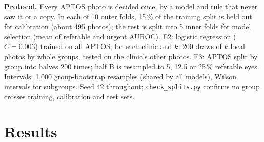 \documentclass[10pt,twocolumn,letterpaper]{article}
\newcommand{\pct}{\,\%}
\begin{document}
\textbf{Protocol.} Every APTOS photo is decided once, by a model and rule that never saw it or a copy. In each of 10 outer folds, 15\pct{} of the training split is held out for calibration (about 495 photos); the rest is split into 5 inner folds for model selection (mean of referable and urgent AUROC). E2: logistic regression ($C{=}0.003$) trained on all APTOS; for each clinic and $k$, 200 draws of $k$ local photos by whole groups, tested on the clinic's other photos. E3: APTOS split by group into halves 200 times; half B is resampled to 5, 12.5 or 25\pct{} referable eyes. Intervals: 1,000 group-bootstrap resamples (shared by all models), Wilson intervals for subgroups. Seed 42 throughout; \texttt{check\_splits.py} confirms no group crosses training, calibration and test sets.

\section{Results}
\end{document}
